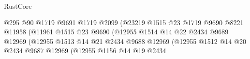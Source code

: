 \begin{lexlean}{RustCore}
\begin{coremodule}
                                                  @295
                                                  @90
                                                  @1719
                                                  @9691
                                                  @1719
                                                  @2099
                                                  (@23219
                                                    @1515
                                                    @23
                                                    @1719
                                                    @9690
                                                    @8221
                                                    @11958
                                                    (@11961
                                                      @1515
                                                      @23
                                                      @9690
                                                      (@12955
                                                        @1514
                                                        @14
                                                        @22
                                                        @2434
                                                        @9689
                                                        @12969
                                                        (@12955
                                                          @1513
                                                          @14
                                                          @21
                                                          @2434
                                                          @9688
                                                          @12969
                                                          (@12955
                                                            @1512
                                                            @14
                                                            @20
                                                            @2434
                                                            @9687
                                                            @12969
                                                            (@12955
                                                              @1156
                                                              @14
                                                              @19
                                                              @2434

\end{coremodule}
\end{lexlean}
